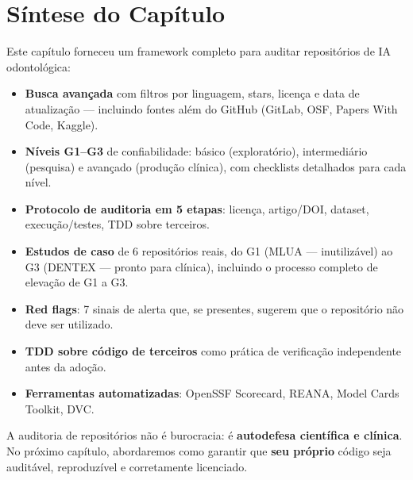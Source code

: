 \section{Síntese do Capítulo}

Este capítulo forneceu um framework completo para auditar repositórios
de IA odontológica:

\begin{itemize}
  \item \textbf{Busca avançada} com filtros por linguagem, stars, licença
    e data de atualização — incluindo fontes além do GitHub (GitLab, OSF,
    Papers With Code, Kaggle).

  \item \textbf{Níveis G1--G3} de confiabilidade: básico (exploratório),
    intermediário (pesquisa) e avançado (produção clínica), com checklists
    detalhados para cada nível.

  \item \textbf{Protocolo de auditoria em 5 etapas}: licença, artigo/DOI,
    dataset, execução/testes, TDD sobre terceiros.

  \item \textbf{Estudos de caso} de 6 repositórios reais, do G1 (MLUA —
    inutilizável) ao G3 (DENTEX — pronto para clínica), incluindo o
    processo completo de elevação de G1 a G3.

  \item \textbf{Red flags}: 7 sinais de alerta que, se presentes, sugerem
    que o repositório não deve ser utilizado.

  \item \textbf{TDD sobre código de terceiros} como prática de verificação
    independente antes da adoção.

  \item \textbf{Ferramentas automatizadas}: OpenSSF Scorecard, REANA,
    Model Cards Toolkit, DVC.
\end{itemize}

A auditoria de repositórios não é burocracia: é \textbf{autodefesa
científica e clínica}. No próximo capítulo, abordaremos como garantir
que \textbf{seu próprio} código seja auditável, reproduzível e
corretamente licenciado.

